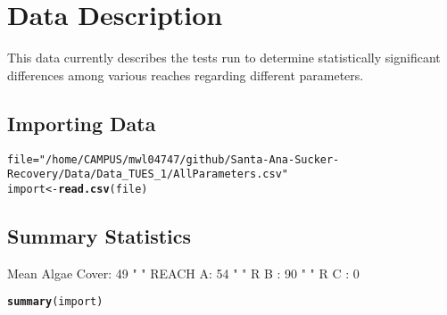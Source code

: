 \documentclass{article}\usepackage[]{graphicx}\usepackage[]{color}
\makeatletter
\newcommand{\hlstr}[1]{\textcolor[rgb]{0.192,0.494,0.8}{#1}}%
\newcommand{\hlstd}[1]{\textcolor[rgb]{0.345,0.345,0.345}{#1}}%
\newcommand{\hlkwb}[1]{\textcolor[rgb]{0.69,0.353,0.396}{#1}}%
\newcommand{\hlkwd}[1]{\textcolor[rgb]{0.737,0.353,0.396}{\textbf{#1}}}%
\newenvironment{kframe}{%
 \def\at@end@of@kframe{}%
 \ifinner\ifhmode%
  \def\at@end@of@kframe{\end{minipage}}%
  \begin{minipage}{\columnwidth}%
 \fi\fi%
 \def\FrameCommand##1{\hskip\@totalleftmargin \hskip-\fboxsep
 \colorbox{shadecolor}{##1}\hskip-\fboxsep
     \hskip-\linewidth \hskip-\@totalleftmargin \hskip\columnwidth}%
 \MakeFramed {\advance\hsize-\width
   \@totalleftmargin\z@ \linewidth\hsize
   \@setminipage}}%
 {\par\unskip\endMakeFramed%
 \at@end@of@kframe}
\newenvironment{knitrout}{}{} %
\makeatother
\begin{document}
\section{Data Description}

This data currently describes the tests run to determine statistically significant differences among various reaches regarding different parameters. 

\subsection{Importing Data}


\begin{knitrout}
\color{fgcolor}\begin{kframe}
\begin{alltt}
\hlstd{file} \hlkwb{=} \hlstr{"/home/CAMPUS/mwl04747/github/Santa-Ana-Sucker-Recovery/Data/Data_TUES_1/AllParameters.csv"}
\hlstd{import} \hlkwb{<-} \hlkwd{read.csv}\hlstd{(file)}
\end{alltt}


{\ttfamily\noindent{}}

{\ttfamily\noindent\bfseries{}}\end{kframe}
\end{knitrout}


\subsection{Summary Statistics}

Mean Algae Cover: 49%
 "      " REACH A: 54%
 "      " R    B : 90%
 "      " R    C : 0%
 
 

\begin{knitrout}
\color{fgcolor}\begin{kframe}
\begin{alltt}
\hlkwd{summary}\hlstd{(import)}
\end{alltt}


{\ttfamily\noindent\bfseries\color{errorcolor}{\#\# Error in summary(import): object 'import' not found}}\end{kframe}
\end{knitrout}
\end{document}
